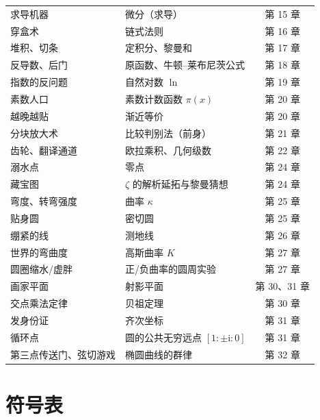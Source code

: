 \begin{center}
\begin{longtable}{p{} p{} c}
求导机器 & 微分（求导） & 第 15 章 \\
穿盒术 & 链式法则 & 第 16 章 \\
堆积、切条 & 定积分、黎曼和 & 第 17 章 \\
反导数、后门 & 原函数、牛顿--莱布尼茨公式 & 第 18 章 \\
指数的反问题 & 自然对数 $\ln$ & 第 19 章 \\
素数人口 & 素数计数函数 $\pi(x)$ & 第 20 章 \\
越晚越贴 & 渐近等价 & 第 20 章 \\
分块放大术 & 比较判别法（前身） & 第 21 章 \\
齿轮、翻译通道 & 欧拉乘积、几何级数 & 第 22 章 \\
溺水点 & 零点 & 第 24 章 \\
藏宝图 & $\zeta$ 的解析延拓与黎曼猜想 & 第 24 章 \\
弯度、转弯强度 & 曲率 $\kappa$ & 第 25 章 \\
贴身圆 & 密切圆 & 第 25 章 \\
绷紧的线 & 测地线 & 第 26 章 \\
世界的弯曲度 & 高斯曲率 $K$ & 第 27 章 \\
圆圈缩水/虚胖 & 正/负曲率的圆周实验 & 第 27 章 \\
画家平面 & 射影平面 & 第 30、31 章 \\
交点乘法定律 & 贝祖定理 & 第 30 章 \\
发身份证 & 齐次坐标 & 第 31 章 \\
循环点 & 圆的公共无穷远点 $[1:\pm\mathrm{i}:0]$ & 第 31 章 \\
第三点传送门、弦切游戏 & 椭圆曲线的群律 & 第 32 章 \\
\bottomrule
\end{longtable}
\end{center}

\chapter{符号表}

